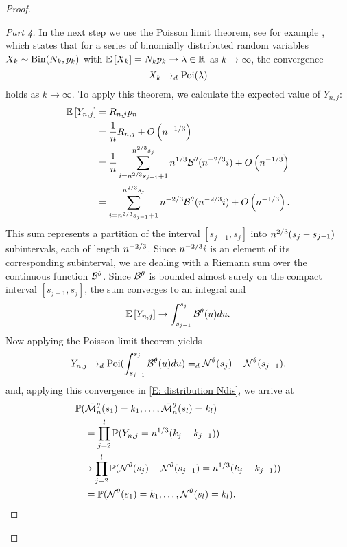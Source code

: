 \begin{proof}
\begin{proof}[Part 4]
In the next step we use the Poisson limit theorem, see for example \cite[Theorem 3.7, p.79]{Klenke.2006},
which states that for a series of binomially distributed random variables $X_k \sim \operatorname*{Bin}(N_k, p_k)$
with $\mathbb{E} \left[ X_k \right] = N_k p_k \rightarrow \lambda \in \mathbb{R}$ as $k \rightarrow \infty$,
the convergence 
\begin{equation}
	X_k \rightarrow_d \operatorname*{Poi}(\lambda)
\end{equation}
holds as $k \rightarrow \infty$.
To apply this theorem, we calculate the expected value of $Y_{n,j}$:
\begin{align*}
\mathbb{E} \left[ Y_{n,j} \right] 
&= R_{n,j} p_n \\
&= \frac{1}{n} R_{n,j} + O\left(n^{-1 / 3}\right)\\
&= \frac{1}{n} \sum_{i=n^{2 / 3}s_{j-1}+1}^{n^{2 / 3}s_j}n^{1 / 3}\mathcal{B}^{\theta}(n^{-2 / 3}i) + O\left(n^{-1 / 3}\right)\\
&= \sum_{i=n^{2 / 3}s_{j-1}+1}^{n^{2 / 3}s_j}n^{-2 / 3}\mathcal{B}^{\theta}(n^{-2 / 3}i) + O\left(n^{-1 / 3}\right).
\end{align*}
This sum represents a partition of the interval $[s_{j-1}, s_j]$ into $n^{2 / 3}(s_j - s_{j-1})$ subintervals, each of length $n^{-2 / 3}$.
Since $n^{-2 / 3}i$ is an element of its corresponding subinterval, 
we are dealing with a Riemann sum over the continuous function $\mathcal{B}^{\theta}$.
Since $\mathcal{B}^{\theta}$ is bounded almost surely on the compact interval $[s_{j-1}, s_j]$,
the sum converges to an integral and
\begin{equation}
\mathbb{E} \left[ Y_{n,j} \right] \rightarrow \int_{s_{j-1}}^{s_j} \mathcal{B}^{\theta}(u)du.
\end{equation}
Now applying the Poisson limit theorem yields
\begin{equation} \label{E: convergence dist Yj}
Y_{n,j} \rightarrow_d \operatorname*{Poi}( \int_{s_{j-1}}^{s_j} \mathcal{B}^{\theta}(u)du ) =_d \mathcal{N}^{\theta}(s_j) - \mathcal{N}^{\theta}(s_{j-1}),
\end{equation}
and, applying this convergence in \eqref{E: distribution Ndis}, we arrive at
\begin{equation*}
\begin{aligned}
&\mathbb{P}(\bar{\mathcal{M}}_n^{\theta}(s_1) = k_1, \dots, \bar{\mathcal{M}}_n^{\theta}(s_l) = k_l) \\
&\quad = \prod_{j=2}^{l} \mathbb{P}( Y_{n,j} = n^{1 / 3}(k_j - k_{j-1}) ) \\
&\enspace \rightarrow \prod_{j=2}^{l} \mathbb{P}( \mathcal{N}^{\theta}(s_j) - \mathcal{N}^{\theta}(s_{j-1}) = n^{1 / 3}(k_j - k_{j-1}) ) \\
&\quad = \mathbb{P}(\mathcal{N}^{\theta}(s_1) = k_1, \dots, \mathcal{N}^{\theta}(s_l) = k_l).
\end{aligned}
\end{equation*}


\end{proof}
\end{proof}
